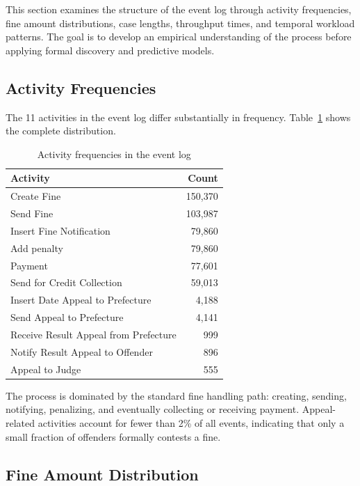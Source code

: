 
This section examines the structure of the event log through activity frequencies, fine amount distributions, case lengths, throughput times, and temporal workload patterns. The goal is to develop an empirical understanding of the process before applying formal discovery and predictive models.

\subsection{Activity Frequencies}

The 11 activities in the event log differ substantially in frequency. Table~\ref{tab:activity_freq} shows the complete distribution.

\begin{table}[h]
\centering
\begin{tabular}{lr}
\hline
\textbf{Activity} & \textbf{Count} \\
\hline
Create Fine & 150,370 \\
Send Fine & 103,987 \\
Insert Fine Notification & 79,860 \\
Add penalty & 79,860 \\
Payment & 77,601 \\
Send for Credit Collection & 59,013 \\
Insert Date Appeal to Prefecture & 4,188 \\
Send Appeal to Prefecture & 4,141 \\
Receive Result Appeal from Prefecture & 999 \\
Notify Result Appeal to Offender & 896 \\
Appeal to Judge & 555 \\
\hline
\end{tabular}
\caption{Activity frequencies in the event log}
\label{tab:activity_freq}
\end{table}

The process is dominated by the standard fine handling path: creating, sending, notifying, penalizing, and eventually collecting or receiving payment. Appeal-related activities account for fewer than 2\% of all events, indicating that only a small fraction of offenders formally contests a fine.

\subsection{Fine Amount Distribution}


